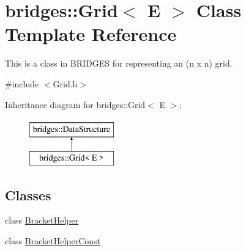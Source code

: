 \hypertarget{classbridges_1_1_grid}{}\section{bridges\+::Grid$<$ E $>$ Class Template Reference}
\label{classbridges_1_1_grid}


This is a class in B\+R\+I\+D\+G\+ES for representing an (n x n) grid.  




{\ttfamily \#include $<$Grid.\+h$>$}

Inheritance diagram for bridges\+::Grid$<$ E $>$\+:\begin{figure}[H]
\begin{center}
\leavevmode
\includegraphics[height=2.000000cm]{classbridges_1_1_grid}
\end{center}
\end{figure}
\subsection*{Classes}
\begin{DoxyCompactItemize}
\item 
class \mbox{\hyperlink{classbridges_1_1_grid_1_1_bracket_helper}{Bracket\+Helper}}
\item 
class \mbox{\hyperlink{classbridges_1_1_grid_1_1_bracket_helper_const}{Bracket\+Helper\+Const}}
\end{DoxyCompactItemize}
